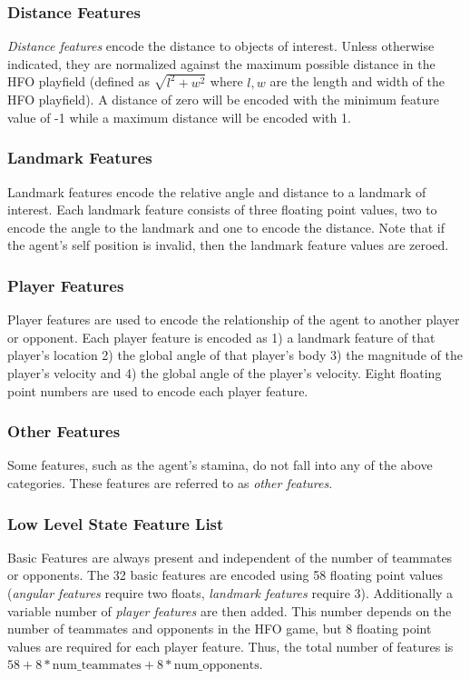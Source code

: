 \documentclass[12pt]{article}
\begin{document}
\subsubsection{Distance Features}

\textit{Distance features} encode the distance to objects of
interest. Unless otherwise indicated, they are normalized against the
maximum possible distance in the HFO playfield (defined as $\sqrt{l^2
  + w^2}$ where $l,w$ are the length and width of the HFO
playfield). A distance of zero will be encoded with the minimum
feature value of -1 while a maximum distance will be encoded with 1.

\subsubsection{Landmark Features}

Landmark features encode the relative angle and distance to a landmark
of interest. Each landmark feature consists of three floating point
values, two to encode the angle to the landmark and one to encode the
distance. Note that if the agent's self position is invalid, then the
landmark feature values are zeroed.

\subsubsection{Player Features}

Player features are used to encode the relationship of the agent to
another player or opponent. Each player feature is encoded as 1) a
landmark feature of that player's location 2) the global angle of that
player's body 3) the magnitude of the player's velocity and 4) the
global angle of the player's velocity. Eight floating point numbers
are used to encode each player feature.

\subsubsection{Other Features}

Some features, such as the agent's stamina, do not fall into any of
the above categories. These features are referred to as \textit{other
  features}.

\subsubsection{Low Level State Feature List}

Basic Features are always present and independent of the number of
teammates or opponents. The 32 basic features are encoded using 58
floating point values (\textit{angular features} require two floats,
\textit{landmark features} require 3). Additionally a variable number
of \textit{player features} are then added. This number depends on the
number of teammates and opponents in the HFO game, but 8 floating
point values are required for each player feature. Thus, the total
number of features is $58 + 8*\textrm{num\_teammates} +
8*\textrm{num\_opponents}$.
\end{document}
